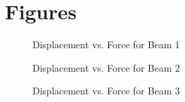 \documentclass{article}
\begin{document}
\section{Figures}
\begin{figure}[htb]
\begin{center}
\caption{Displacement vs. Force for Beam 1}
\end{center}
\end{figure}

\begin{figure}[htb]
\begin{center}
\caption{Displacement vs. Force for Beam 2}
\end{center}
\end{figure}

\begin{figure}[htb]
\begin{center}
\caption{Displacement vs. Force for Beam 3}
\end{center}
\end{figure}
\end{document}
